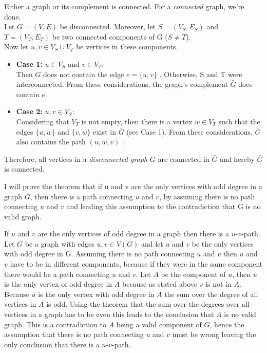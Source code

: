 \documentclass[a4paper]{article}
\begin{document}
	\begin{solution}{3}
		\begin{theorem}{Either a graph or its complement is connected.}
			For a \emph{connected} graph, we're done.\\
			Let $G = (V, E)$ be disconnected. Moreover, let $S = (V_S, E_S)$ and $T = (V_T, E_T)$ be two connected components of G ($S \neq T$).\\
			Now let $u, v \in V_S \cup V_T$ be vertices in these components.
			\begin{itemize}
				\item \textbf{Case 1: } $u \in V_S$ and $v \in V_T$.\\
					Then $G$ does not contain the edge $e = \{u, v\}$ . Otherwise, S and T were interconnected. From these considerations, the graph's complement $\bar{G}$ does contain $e$.
				\item  \textbf{Case 2: } $u, v \in V_S$:\\
					Considering that $V_T$ is not empty, then there is a vertex $w \in V_T$ such that the edges $\{u, w\}$ and $\{v, w\}$ exist in $\bar{G}$ (see Case 1). From these considerations, $\bar{G}$ also contains the path $(u, w, v)$ .
			\end{itemize}
			Therefore, all vertices in a \emph{disconnected graph} $G$ are connected in $\bar{G}$ and hereby $\bar{G}$ is connected.\\
		\end{theorem}
	\end{solution} 
	\newpage
	\begin{solution}{4}
		I will prove the theorem that if u and v are the only vertices with odd degree in a graph $G$, then there is a path connecting $u$ and $v$, by assuming there is no path connecting $u$ and $v$ and leading this assumption to the contradiction that G is no valid graph. 
		\begin{theorem}{If $u$ and $v$ are the only vertices of odd degree in a graph then there is a $u$-$v$-path.}
		Let $G$ be a graph with edges $u,v \in V(G)$ and let $u$ and $v$ be the only vertices with odd degree in G. 
		Assuming there is no path connecting $u$ and $v$ then $u$ and $v$ have to be in different components, because if they were in the same component there would be a path connecting $u$ and $v$. 
		Let $A$ be the component of $u$, then $u$ is the only vertex of odd degree in $A$ because as stated above $v$ is not in $A$. Because $u$ is the only vertex with odd degree in $A$ the sum over the degree of all vertices in $A$ is odd. 
		Using the theorem that the sum over the degrees over all vertices in a graph has to be even this leads to the conclusion that $A$ is no valid graph. 
		This is a contradiction to $A$ being a valid component of $G$, hence the assumption that there is no path connecting $u$ and $v$ must be wrong leaving the only conclusion that there is a $u$-$v$-path.	
		\end{theorem}
	\end{solution}
\end{document}
